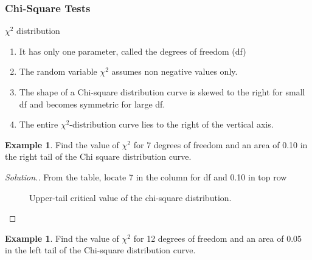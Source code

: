 \documentclass[11pt,a4paper]{article}
\theoremstyle{definition}
\newtheorem{example}[thm]{Example}
\newenvironment{solution}
  {\renewcommand{\qedsymbol}{}\begin{proof}[\textit{Solution}.]}
  {\end{proof}}
\begin{document}
\pagebreak
\subsubsection{Chi-Square Tests}

$\chi^2$ distribution
\begin{enumerate}
\item[$\bullet$] It has only one parameter, called the degrees of freedom (df)
\item[$\bullet$] The random variable $\chi^2$ assumes non negative values only.
\item[$\bullet$] The shape of a Chi-square distribution curve is skewed to the right for small df and becomes symmetric for large df.
\item[$\bullet$] The entire $\chi^2$-distribution curve lies to the right of the vertical axis.
\end{enumerate}






\begin{example}
Find the value of $\chi^2$ for 7 degrees of freedom and an area of 0.10 in the right tail of the Chi square distribution curve.\\
\end{example}

\begin{solution}
From the table, locate 7 in the column for df and 0.10 in top row


\begin{figure}[H]
\centering
{}
\caption{Upper-tail critical value of the chi-square distribution.}
\end{figure}
\end{solution}





\begin{example}
Find the value of $\chi^2$ for 12 degrees of freedom and an area of 0.05 in the left tail of the Chi-square distribution curve.\\
\end{example}
\end{document}
